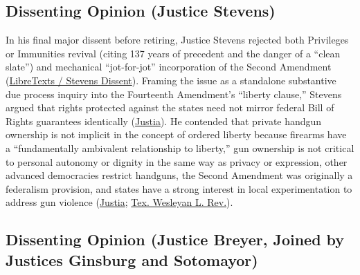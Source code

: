 \documentclass[12pt]{article}
\begin{document}
\subsection{Dissenting Opinion (Justice Stevens)}

In his final major dissent before retiring, Justice Stevens rejected both Privileges or Immunities revival (citing 137 years of precedent and the danger of a ``clean slate'') and mechanical ``jot-for-jot'' incorporation of the Second Amendment (\href{https://biz.libretexts.org/Bookshelves/Constitutional_Law/Liberty_Equality_and_Due_Process\%3A_Cases_Controversies_and_Contexts_in_Constitutional_Law/01\%3A_Chapters/1.10\%3A_CHAPTER_EIGHT-_Incorporation_and_Fundamental_Rights}{LibreTexts / Stevens Dissent}). Framing the issue as a standalone substantive due process inquiry into the Fourteenth Amendment's ``liberty clause,'' Stevens argued that rights protected against the states need not mirror federal Bill of Rights guarantees identically (\href{https://supreme.justia.com/cases/federal/us/561/742/}{Justia}). He contended that private handgun ownership is not implicit in the concept of ordered liberty because firearms have a ``fundamentally ambivalent relationship to liberty,'' gun ownership is not critical to personal autonomy or dignity in the same way as privacy or expression, other advanced democracies restrict handguns, the Second Amendment was originally a federalism provision, and states have a strong interest in local experimentation to address gun violence (\href{https://supreme.justia.com/cases/federal/us/561/742/}{Justia}; \href{https://scholarship.law.tamu.edu/context/txwes-lr/article/1481/viewcontent/10.37419_3ATWLR.V19.I3.3.pdf}{Tex. Wesleyan L. Rev.}).

\subsection{Dissenting Opinion (Justice Breyer, Joined by Justices Ginsburg and Sotomayor)}
\end{document}
